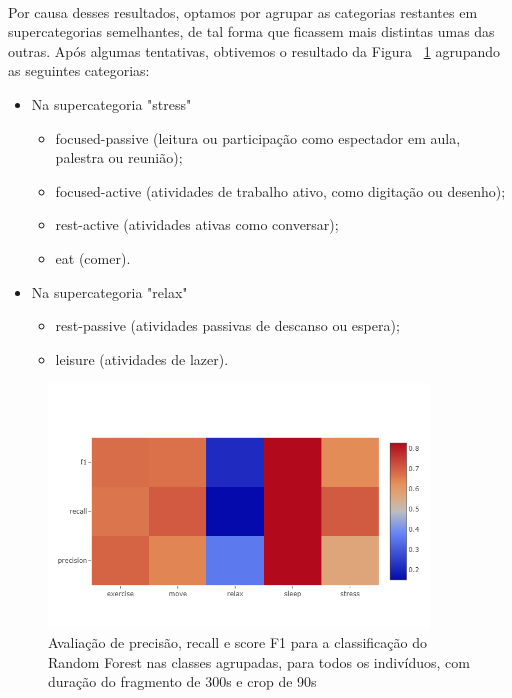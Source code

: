             \paragraph{} Por causa desses resultados, optamos por agrupar as categorias restantes em supercategorias semelhantes, de tal forma que ficassem mais distintas umas das outras. Após algumas tentativas, obtivemos o resultado da Figura ~\ref{group2} agrupando as seguintes categorias:
            \begin{itemize} 
                \item Na supercategoria "stress"
                \begin{itemize} 
                    \item focused-passive (leitura ou participação como espectador em aula, palestra ou reunião);
                    \item focused-active (atividades de trabalho ativo, como digitação ou desenho);
                    \item rest-active (atividades ativas como conversar);
                    \item eat (comer).
                \end{itemize}
                \item Na supercategoria "relax"
                \begin{itemize} 
                    \item rest-passive (atividades passivas de descanso ou espera);
                    \item leisure (atividades de lazer).
                \end{itemize}
            \end{itemize}
            
            \begin{figure}[h!]
            	\centering
            	\includegraphics[width=0.9\textwidth]{Figures/classif/class_group2.png}
            	\caption{Avaliação de precisão, recall e score F1 para a classificação do Random Forest nas classes agrupadas, para todos os indivíduos, com duração do fragmento de  300s e crop de 90s}
                \label{group2}
            \end{figure}
            
